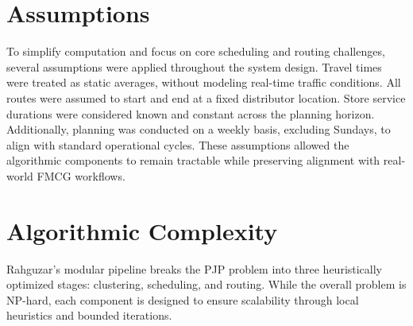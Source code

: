 \section{Assumptions}
To simplify computation and focus on core scheduling and routing challenges, several assumptions were applied throughout the system design. Travel times were treated as static averages, without modeling real-time traffic conditions. All routes were assumed to start and end at a fixed distributor location. Store service durations were considered known and constant across the planning horizon. Additionally, planning was conducted on a weekly basis, excluding Sundays, to align with standard operational cycles. These assumptions allowed the algorithmic components to remain tractable while preserving alignment with real-world FMCG workflows.


\section{Algorithmic Complexity}

Rahguzar’s modular pipeline breaks the PJP problem into three heuristically optimized stages: clustering, scheduling, and routing. While the overall problem is NP-hard, each component is designed to ensure scalability through local heuristics and bounded iterations.

